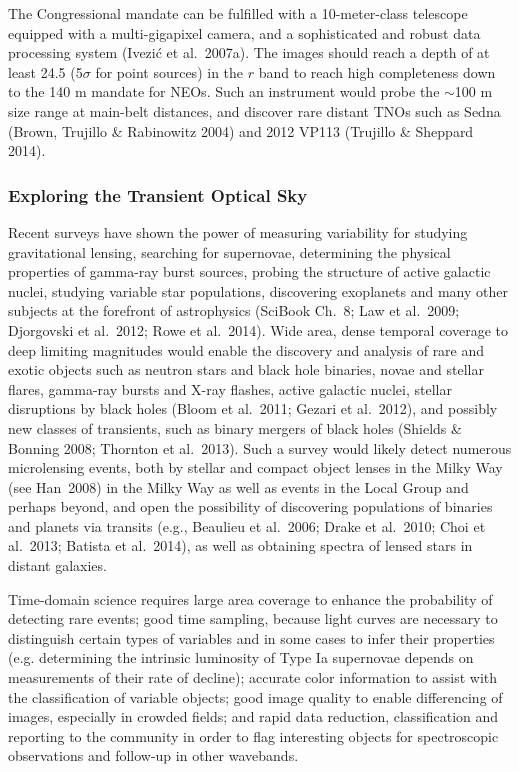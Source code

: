 \documentclass{emulateapj}
\begin{document}
The Congressional mandate can be fulfilled with a 10-meter-class
telescope equipped with a multi-gigapixel camera, and a sophisticated  
and robust data processing system (Ivezi\'{c} et al.~2007a). The images should reach a depth of at 
least 24.5 (5$\sigma$ for point sources) in the $r$ band to reach high
completeness down to the 140 m mandate for NEOs.  Such an instrument
would probe the $\sim$100 m size range at main-belt distances, and
discover rare distant TNOs such as Sedna (Brown, Trujillo \&
Rabinowitz 2004) and 2012 VP113 (Trujillo \& Sheppard 2014). 


\subsubsection{ Exploring the Transient Optical Sky}

Recent surveys have shown the power of measuring variability for studying gravitational lensing, searching 
for supernovae, determining the physical properties of gamma-ray burst sources, probing the structure of 
active galactic nuclei, studying variable star populations, discovering exoplanets 
and many other subjects at the forefront of astrophysics (SciBook
Ch.~8; Law et al.~2009; Djorgovski et al.~2012; Rowe et al.~2014). Wide area, dense
temporal coverage to deep limiting magnitudes would enable the
discovery and  
analysis of rare and exotic objects such as neutron stars and black hole binaries, novae and stellar flares, 
gamma-ray bursts and X-ray flashes, active galactic nuclei, stellar disruptions by black holes (Bloom et al.~2011;
Gezari et al.~2012), and possibly new classes of transients, such as
binary mergers of black holes (Shields \& 
Bonning 2008; Thornton et al.~2013). Such a survey would likely detect numerous microlensing events, both by stellar and compact object lenses in the Milky Way (see Han~2008) in the Milky Way as well as events in the Local Group and perhaps beyond, and open the possibility of discovering populations of binaries and planets via transits (e.g., Beaulieu et al.~2006; Drake et al.~2010; Choi et al.~2013; Batista et al.~2014), as well as obtaining spectra of lensed stars in distant galaxies.

Time-domain science requires large area coverage to enhance the probability of detecting rare events; good 
time sampling, because light curves are necessary to distinguish certain types of variables and in some cases 
to infer their properties (e.g. determining the intrinsic luminosity of Type Ia supernovae depends on measurements 
of their rate of decline); accurate color information to assist with the classification of variable objects; good 
image quality to enable differencing of images, especially in crowded fields; and rapid data reduction, classification 
and reporting to the community in order to flag interesting objects
for spectroscopic observations and follow-up in other wavebands.  
\end{document}
